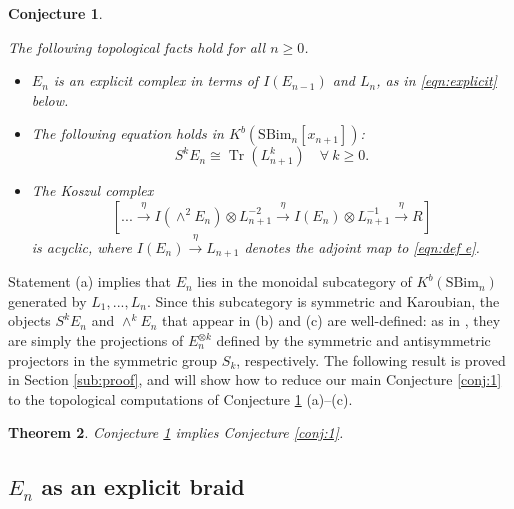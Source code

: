 \documentclass[12pt]{amsart}
\numberwithin{equation}{section}
\newtheorem{theorem}{Theorem}[section]
\newtheorem{conjecture}[theorem]{Conjecture}
\theoremstyle{definition}
\theoremstyle{remark}
\DeclareMathOperator{\Tr}{Tr}
\renewcommand{\1}{\mathbf{1}}
\newcommand{\SBim}{\mathrm{SBim}}
\begin{document}
\begin{conjecture}
\label{conj:main}

The following topological facts hold for all $n\geq 0$.

\begin{itemize}

\item[(a)] $E_n$ is an explicit complex in terms of $I(E_{n-1})$ and $L_n$, as in \eqref{eqn:explicit} below.

\item[(b)] The following equation holds in $K^b(\SBim_n[x_{n+1}])$:
\begin{equation}
\label{eqn:conjmain}
S^k E_n \cong \Tr(L_{n+1}^k) \quad \forall \ k\ge 0. 
\end{equation}

\item[(c)] The Koszul complex 
\begin{equation}
\label{eqn:koszul topology}
\left[... \stackrel{\eta}\longrightarrow I(\wedge^2 E_n) \otimes L_{n+1}^{-2} \stackrel{\eta}\longrightarrow I(E_n) \otimes L_{n+1}^{-1} \stackrel{\eta}\longrightarrow R \right]
\end{equation}
is acyclic, where $I(E_n) \stackrel{\eta}\rightarrow L_{n+1}$ denotes the adjoint map to \eqref{eqn:def e}.

\end{itemize}

\end{conjecture}

Statement (a) implies that $E_n$ lies in the monoidal subcategory of $K^b(\SBim_n)$ generated by $L_1,...,L_n$. Since this subcategory is symmetric and Karoubian, the objects $S^k E_n$ and $\wedge^k E_n$ that appear in (b) and (c) are well-defined: as in \cite{Deligne}, they are simply the projections of $E_n^{\otimes k}$ defined by the symmetric and antisymmetric projectors in the symmetric group $S_k$, respectively. The following result is proved in Section \ref{sub:proof}, and will show how to reduce our main Conjecture \ref{conj:1} to the topological computations of Conjecture \ref{conj:main} (a)--(c).

\begin{theorem}
\label{thm:one implies the other}
Conjecture \ref{conj:main} implies Conjecture \ref{conj:1}.
\end{theorem}

\subsection{$E_n$ as an explicit braid}
\label{sub:explicit braid}
\end{document}
